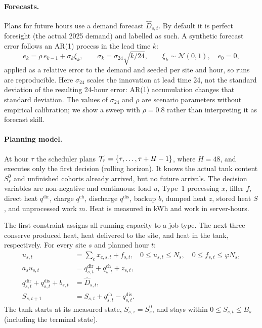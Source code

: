 \paragraph{Forecasts.} Plans for future hours use a demand forecast $\hat D_{s,t}$. By default it is
perfect foresight (the actual 2025 demand) and labelled as such. A synthetic forecast error follows
an AR(1) process in the lead time $k$:
\begin{equation}
  e_k = \rho\, e_{k-1} + \sigma_k \xi_k,\qquad \sigma_k = \sigma_{24}\sqrt{k/24},\qquad
  \xi_k \sim \mathcal{N}(0,1),\quad e_0 = 0,
  \label{eq:ar1}
\end{equation}
applied as a relative error to the demand and seeded per site and hour, so runs are reproducible.
Here $\sigma_{24}$ scales the innovation at lead time 24, not the standard deviation of the
resulting 24-hour error: AR(1) accumulation changes that standard deviation. The values of
$\sigma_{24}$ and $\rho$ are scenario parameters without empirical calibration; we show a
sweep with $\rho=0.8$ rather than interpreting it as forecast skill.

\paragraph{Planning model.} At hour $\tau$ the scheduler plans
$\mathcal{T}_\tau = \{\tau,\ldots,\tau+H-1\}$, where $H=48$, and executes only the first decision
(rolling horizon). It knows the actual tank content $S^0_s$ and
unfinished cohorts already arrived, but no future arrivals. The decision variables are
non-negative and continuous: load $u$, Type~1 processing $x$, filler $f$, direct heat $q^{\mathrm{dir}}$,
charge $q^{\mathrm{ch}}$, discharge $q^{\mathrm{dis}}$, backup $b$, dumped heat $z$, stored heat
$S$, and unprocessed work $m$. Heat is measured in kWh and work in server-hours.

The first constraint assigns all running capacity to a job type. The next three conserve
produced heat, heat delivered to the site, and heat in the tank, respectively. For every site
$s$ and planned hour $t$:
\begin{align}
  u_{s,t} &= \sum_c x_{c,s,t}+f_{s,t},
  &0\le u_{s,t}\le N_s,\quad 0\le f_{s,t}\le\varphi N_s, \label{eq:load}\\
  a_su_{s,t} &= q^{\mathrm{dir}}_{s,t}+q^{\mathrm{ch}}_{s,t}+z_{s,t}, \label{eq:produce}\\
  q^{\mathrm{dir}}_{s,t}+q^{\mathrm{dis}}_{s,t}+b_{s,t} &= \hat D_{s,t}, \label{eq:demand}\\
  S_{s,t+1} &= S_{s,t}+q^{\mathrm{ch}}_{s,t}-q^{\mathrm{dis}}_{s,t}. \label{eq:tank}
\end{align}
The tank starts at its measured state, $S_{s,\tau}=S^0_s$, and stays within
$0\le S_{s,t}\le B_s$ (including the terminal state).

